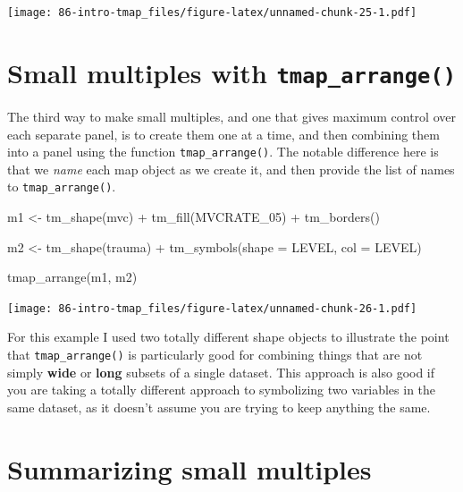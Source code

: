 \documentclass[
]{book}
\newenvironment{Shaded}{\begin{snugshade}}{\end{snugshade}}
\newcommand{\AttributeTok}[1]{\textcolor[rgb]{0.77,0.63,0.00}{#1}}
\newcommand{\FunctionTok}[1]{\textcolor[rgb]{0.00,0.00,0.00}{#1}}
\newcommand{\NormalTok}[1]{#1}
\newcommand{\OtherTok}[1]{\textcolor[rgb]{0.56,0.35,0.01}{#1}}
\newcommand{\SpecialCharTok}[1]{\textcolor[rgb]{0.00,0.00,0.00}{#1}}
\newcommand{\StringTok}[1]{\textcolor[rgb]{0.31,0.60,0.02}{#1}}
\begin{document}
\texttt{[image: 86-intro-tmap\_files/figure-latex/unnamed-chunk-25-1.pdf]}

\hypertarget{small-multiples-with-tmap_arrange}{%
\section{\texorpdfstring{Small multiples with \texttt{tmap\_arrange()}}{Small multiples with tmap\_arrange()}}\label{small-multiples-with-tmap_arrange}}

The third way to make small multiples, and one that gives maximum control over each separate panel, is to create them one at a time, and then combining them into a panel using the function \texttt{tmap\_arrange()}. The notable difference here is that we \emph{name} each map object as we create it, and then provide the list of names to \texttt{tmap\_arrange()}.

\begin{Shaded}
\begin{Highlighting}[]
\NormalTok{m1 }\OtherTok{\textless{}{-}} \FunctionTok{tm\_shape}\NormalTok{(mvc) }\SpecialCharTok{+}
  \FunctionTok{tm\_fill}\NormalTok{(}\StringTok{\textquotesingle{}MVCRATE\_05\textquotesingle{}}\NormalTok{) }\SpecialCharTok{+}
  \FunctionTok{tm\_borders}\NormalTok{()}

\NormalTok{m2 }\OtherTok{\textless{}{-}} \FunctionTok{tm\_shape}\NormalTok{(trauma) }\SpecialCharTok{+}
  \FunctionTok{tm\_symbols}\NormalTok{(}\AttributeTok{shape =} \StringTok{\textquotesingle{}LEVEL\textquotesingle{}}\NormalTok{,}
             \AttributeTok{col =} \StringTok{\textquotesingle{}LEVEL\textquotesingle{}}\NormalTok{)}

\FunctionTok{tmap\_arrange}\NormalTok{(m1, m2)}
\end{Highlighting}
\end{Shaded}

\texttt{[image: 86-intro-tmap\_files/figure-latex/unnamed-chunk-26-1.pdf]}

For this example I used two totally different shape objects to illustrate the point that \texttt{tmap\_arrange()} is particularly good for combining things that are not simply \textbf{wide} or \textbf{long} subsets of a single dataset. This approach is also good if you are taking a totally different approach to symbolizing two variables in the same dataset, as it doesn't assume you are trying to keep anything the same.

\hypertarget{summarizing-small-multiples}{%
\section{Summarizing small multiples}\label{summarizing-small-multiples}}
\end{document}
